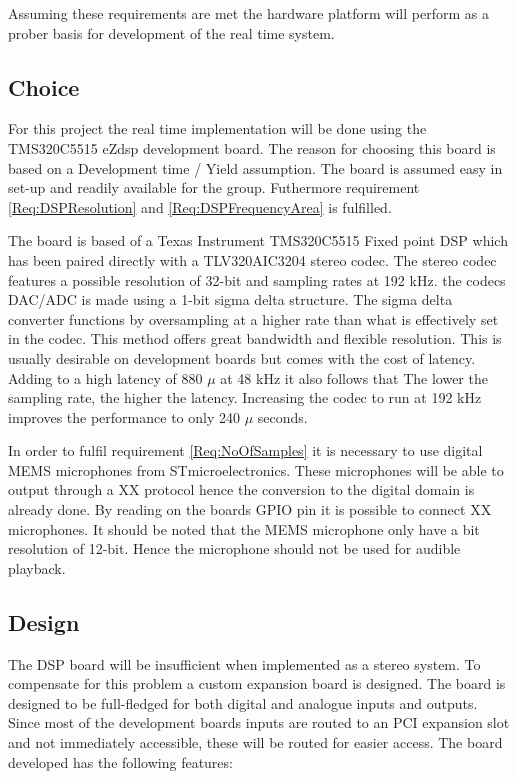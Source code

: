 Assuming these requirements are met the hardware platform will perform as a prober basis for development of the real time system.

\subsection{Choice}

For this project the real time implementation will be done using the TMS320C5515 eZdsp development board. The reason for choosing this board is based on a Development time / Yield assumption. The board is assumed easy in set-up and readily available for the group. Futhermore requirement \ref{Req:DSPResolution} and \ref{Req:DSPFrequencyArea} is fulfilled.

The board is based of a Texas Instrument TMS320C5515 Fixed point DSP which has been paired directly with a TLV320AIC3204 stereo codec. The stereo codec features a possible resolution of 32-bit and sampling rates at 192 kHz. the codecs DAC/ADC is made using a 1-bit sigma delta structure. The sigma delta converter functions by oversampling at a higher rate than what is effectively set in the codec. This method offers great bandwidth and flexible resolution. This is usually desirable on development boards but comes with the cost of latency. Adding to a high latency of 880 $\mu$ at 48 kHz it also follows that The lower the sampling rate, the higher the latency. Increasing the codec to run at 192 kHz improves the performance to only 240 $\mu$ seconds.

In order to fulfil requirement \ref{Req:NoOfSamples} it is necessary to use digital MEMS microphones from STmicroelectronics. These microphones will be able to output through a XX protocol hence the conversion to the digital domain is already done. By reading on the boards GPIO pin it is possible to connect XX microphones. It should be noted that the MEMS microphone only have a bit resolution of 12-bit. Hence the microphone should not be used for audible playback.





\subsection{Design}

The DSP board will be insufficient when implemented as a stereo system. To compensate for this problem a custom expansion board is designed. The board is designed to be full-fledged for both digital and analogue inputs and outputs. Since most of the development boards inputs are routed to an PCI expansion slot and not immediately accessible, these will be routed for easier access. The board developed has the following features:

